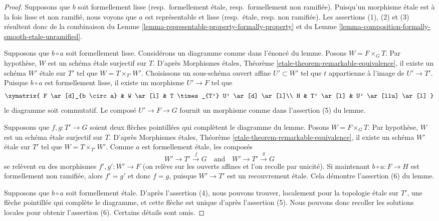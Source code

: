 \begin{proof}
Supposons que $b$ soit formellement lisse (resp.\ formellement étale,
resp.\ formellement non ramifiée). Puisqu'un morphisme étale est à la fois
lisse et non ramifié, nous voyons que $a$ est représentable et lisse
(resp.\ étale, resp. non ramifiée). Les assertions (1), (2) et (3)
résultent donc de la combinaison du
Lemme \ref{lemma-representable-property-formally-property}
et du
Lemme \ref{lemma-composition-formally-smooth-etale-unramified}.

\medskip\noindent
Supposons que $b \circ a$ soit formellement lisse. Considérons un diagramme
comme dans l'énoncé du lemme. Posons $W = F \times_G T$.
Par hypothèse, $W$ est un schéma étale surjectif sur $T$. D'après
Morphismes étales, Théorème \ref{etale-theorem-remarkable-equivalence},
il existe un schéma $W'$ étale sur $T'$ tel que $W = T \times_{T'} W'$.
Choisissons un sous-schéma ouvert affine $U' \subset W'$ tel que $t$ appartienne à
l'image de $U' \to T'$. Puisque $b \circ a$ est formellement
lisse, il existe un morphisme $U' \to F$ tel que
$$
\xymatrix{
F \ar[d]_{b \circ a} & W \ar[l] & T \times_{T'} U' \ar[d] \ar[l]\\
H & T' \ar[l] & U' \ar[llu] \ar[l]
}
$$
le diagramme soit commutatif. Le composé $U' \to F \to G$ fournit un
morphisme comme dans l'assertion (5) du lemme.

\medskip\noindent
Supposons que $f, g : T' \to G$ soient deux flèches pointillées qui complètent le
diagramme du lemme. Posons $W = F \times_G T$.
Par hypothèse, $W$ est un schéma étale surjectif sur $T$. D'après
Morphismes étales, Théorème \ref{etale-theorem-remarkable-equivalence},
il existe un schéma $W'$ étale sur $T'$ tel que $W = T \times_{T'} W'$.
Comme $a$ est formellement étale, les composés
$$
W' \to T' \xrightarrow{f} G
\quad\text{and}\quad
W' \to T' \xrightarrow{g} G
$$
se relèvent en des morphismes $f', g' : W' \to F$ (on relève sur les ouverts affines et l'on recolle par
unicité). Si maintenant $b \circ a : F \to H$ est formellement non ramifiée, alors
$f' = g'$ et donc $f = g$, puisque $W' \to T'$ est un recouvrement étale. Cela démontre
l'assertion (6) du lemme.

\medskip\noindent
Supposons que $b \circ a$ soit formellement étale. D'après l'assertion (4), nous
pouvons trouver, localement pour la topologie étale sur $T'$, une flèche pointillée qui complète le diagramme,
et cette flèche est unique d'après l'assertion (5). Nous pouvons donc recoller les
solutions locales pour obtenir l'assertion (6). Certains détails sont omis.
\end{proof}

